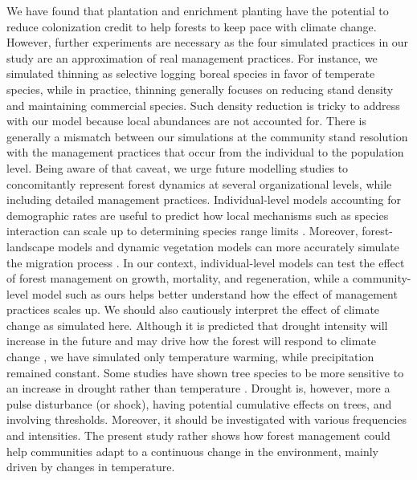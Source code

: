 We have found that plantation and enrichment planting have the potential
to reduce colonization credit to help forests to keep pace with climate
change. However, further experiments are necessary as the four simulated
practices in our study are an approximation of real management
practices. For instance, we simulated thinning as selective logging
boreal species in favor of temperate species, while in practice,
thinning generally focuses on reducing stand density and maintaining
commercial species. Such density reduction is tricky to address with our
model because local abundances are not accounted for. There is generally
a mismatch between our simulations at the community stand resolution
with the management practices that occur from the individual to the
population level. Being aware of that caveat, we urge future modelling
studies to concomitantly represent forest dynamics at several
organizational levels, while including detailed management practices.
Individual-level models accounting for demographic rates are useful to
predict how local mechanisms such as species interaction can scale up to
determining species range limits
\citep{Araujo2014a, Normand2014, Snell2014}. Moreover, forest-landscape
models and dynamic vegetation models can more accurately simulate the
migration process \citep{Lehsten2019}. In our context, individual-level
models can test the effect of forest management on growth, mortality,
and regeneration, while a community-level model such as ours helps
better understand how the effect of management practices scales up. We
should also cautiously interpret the effect of climate change as
simulated here. Although it is predicted that drought intensity will
increase in the future and may drive how the forest will respond to
climate change \citep{Greenwood2017}, we have simulated only temperature
warming, while precipitation remained constant. Some studies have shown
tree species to be more sensitive to an increase in drought rather than
temperature \citep[\emph{e.g.} white spruce][]{Andalo2005}. Drought is,
however, more a pulse disturbance (or shock), having potential
cumulative effects on trees, and involving thresholds. Moreover, it
should be investigated with various frequencies and intensities. The
present study rather shows how forest management could help communities
adapt to a continuous change in the environment, mainly driven by
changes in temperature.\\

